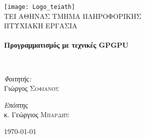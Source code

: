 \begin{titlepage}
\begin{center}

\texttt{[image: Logo\_teiath]}~\\[1cm]

\textsc{\LARGE ΤΕΙ ΑΘΗΝΑΣ ΤΜΗΜΑ ΠΛΗΡΟΦΟΡΙΚΗΣ}\\[1.5cm]

\textsc{\Large ΠΤΥΧΙΑΚΗ ΕΡΓΑΣΙΑ}\\[0.5cm]

\HRule \\[0.4cm]
{ \huge \bfseries Προγραμματισμός με τεχνικές GPGPU \\[0.4cm] }

\HRule \\[1.5cm]

\begin{minipage}{0.4\textwidth}
\begin{flushleft} \large
\emph{Φοιτητής:}\\
Γιώργος \textsc{Σοφιανός}
\end{flushleft}
\end{minipage}
\begin{minipage}{0.4\textwidth}
\begin{flushright} \large
\emph{Επόπτης} \\
κ. Γεώργιος \textsc{Μπαρδής}
\end{flushright}
\end{minipage}

\vfill

{\large \today}

\end{center}
\end{titlepage}